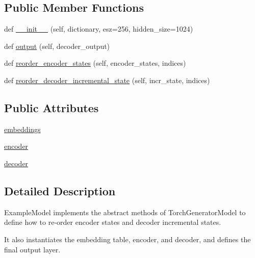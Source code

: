 \subsection*{Public Member Functions}
\begin{DoxyCompactItemize}
\item 
def \hyperlink{classparlai_1_1agents_1_1examples_1_1seq2seq_1_1ExampleModel_a5288fbc80f0ba4e333c16febb9695a12}{\+\_\+\+\_\+init\+\_\+\+\_\+} (self, dictionary, esz=256, hidden\+\_\+size=1024)
\item 
def \hyperlink{classparlai_1_1agents_1_1examples_1_1seq2seq_1_1ExampleModel_a22843705775faa14eca6871c0a681147}{output} (self, decoder\+\_\+output)
\item 
def \hyperlink{classparlai_1_1agents_1_1examples_1_1seq2seq_1_1ExampleModel_adfb376efc6b36f7008281570a2a2ec9d}{reorder\+\_\+encoder\+\_\+states} (self, encoder\+\_\+states, indices)
\item 
def \hyperlink{classparlai_1_1agents_1_1examples_1_1seq2seq_1_1ExampleModel_a4ca40e49a069cce1f07eee55666b2b05}{reorder\+\_\+decoder\+\_\+incremental\+\_\+state} (self, incr\+\_\+state, indices)
\end{DoxyCompactItemize}
\subsection*{Public Attributes}
\begin{DoxyCompactItemize}
\item 
\hyperlink{classparlai_1_1agents_1_1examples_1_1seq2seq_1_1ExampleModel_a98cc5d5376e027de1f7a4380745be560}{embeddings}
\item 
\hyperlink{classparlai_1_1agents_1_1examples_1_1seq2seq_1_1ExampleModel_a533964dd8bb334071264e445a2b943ab}{encoder}
\item 
\hyperlink{classparlai_1_1agents_1_1examples_1_1seq2seq_1_1ExampleModel_a52e8840bc136b8355566d7af8f2f2fa3}{decoder}
\end{DoxyCompactItemize}


\subsection{Detailed Description}
\begin{DoxyVerb}ExampleModel implements the abstract methods of TorchGeneratorModel to define how to
re-order encoder states and decoder incremental states.

It also instantiates the embedding table, encoder, and decoder, and defines the
final output layer.
\end{DoxyVerb}
 


